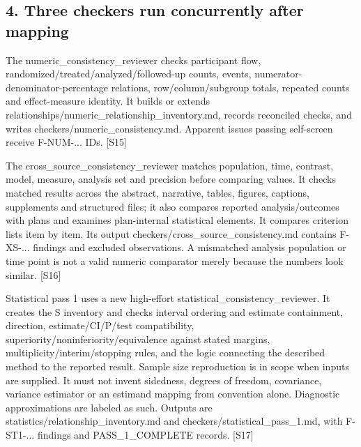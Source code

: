 \documentclass[10pt,a4paper]{article}
\begin{document}
\subsection*{4.\allowbreak{} Three checkers run concurrently after mapping}
The numeric\_\allowbreak{}consistency\_\allowbreak{}reviewer checks participant flow, randomized/\allowbreak{}treated/\allowbreak{}analyzed/\allowbreak{}followed-\allowbreak{}up counts, events, numerator-\allowbreak{}denominator-\allowbreak{}percentage relations, row/\allowbreak{}column/\allowbreak{}subgroup totals, repeated counts and effect-\allowbreak{}measure identity.\allowbreak{} It builds or extends relationships/\allowbreak{}numeric\_\allowbreak{}relationship\_\allowbreak{}inventory.\allowbreak{}md, records reconciled checks, and writes checkers/\allowbreak{}numeric\_\allowbreak{}consistency.\allowbreak{}md.\allowbreak{} Apparent issues passing self-\allowbreak{}screen receive F-\allowbreak{}NUM-\allowbreak{}.\allowbreak{}.\allowbreak{}.\allowbreak{} IDs.\allowbreak{} [S15]\par
The cross\_\allowbreak{}source\_\allowbreak{}consistency\_\allowbreak{}reviewer matches population, time, contrast, model, measure, analysis set and precision before comparing values.\allowbreak{} It checks matched results across the abstract, narrative, tables, figures, captions, supplements and structured files; it also compares reported analysis/\allowbreak{}outcomes with plans and examines plan-\allowbreak{}internal statistical elements.\allowbreak{} It compares criterion lists item by item.\allowbreak{} Its output checkers/\allowbreak{}cross\_\allowbreak{}source\_\allowbreak{}consistency.\allowbreak{}md contains F-\allowbreak{}XS-\allowbreak{}.\allowbreak{}.\allowbreak{}.\allowbreak{} findings and excluded observations.\allowbreak{} A mismatched analysis population or time point is not a valid numeric comparator merely because the numbers look similar.\allowbreak{} [S16]\par
Statistical pass 1 uses a new high-\allowbreak{}effort statistical\_\allowbreak{}consistency\_\allowbreak{}reviewer.\allowbreak{} It creates the S inventory and checks interval ordering and estimate containment, direction, estimate/\allowbreak{}CI/\allowbreak{}P/\allowbreak{}test compatibility, superiority/\allowbreak{}noninferiority/\allowbreak{}equivalence against stated margins, multiplicity/\allowbreak{}interim/\allowbreak{}stopping rules, and the logic connecting the described method to the reported result.\allowbreak{} Sample size reproduction is in scope when inputs are supplied.\allowbreak{} It must not invent sidedness, degrees of freedom, covariance, variance estimator or an estimand mapping from convention alone.\allowbreak{} Diagnostic approximations are labeled as such.\allowbreak{} Outputs are statistics/\allowbreak{}relationship\_\allowbreak{}inventory.\allowbreak{}md and checkers/\allowbreak{}statistical\_\allowbreak{}pass\_\allowbreak{}1.\allowbreak{}md, with F-\allowbreak{}ST1-\allowbreak{}.\allowbreak{}.\allowbreak{}.\allowbreak{} findings and PASS\_\allowbreak{}1\_\allowbreak{}COMPLETE records.\allowbreak{} [S17]\par
\end{document}
